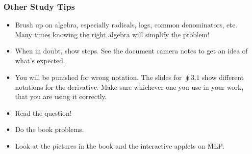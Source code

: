 \documentclass[14pt]{beamer}
\begin{document}
\begin{frame}
\frametitle{Other Study Tips}
\footnotesize
\begin{itemize}
\item Brush up on algebra, especially radicals, logs, common denominators, etc.  Many times knowing the right algebra will simplify the problem!
\item When in doubt, show steps.  See the document camera notes to get an idea of what's expected.
\item You will be punished for wrong notation.  The slides for $\oint 3.1$ show different notations for the derivative.  Make sure whichever one you use in your work, that you are using it correctly.
\item Read the question!  
\item Do the book problems.
\item Look at the pictures in the book and the interactive applets on MLP.
\end{itemize}
\end{frame}

\begin{comment}
\end{comment}
\end{document}
